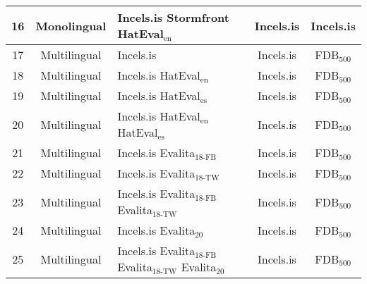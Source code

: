 \begin{tabular}{|c|c|p{4cm}|c|c|}
16 & Monolingual & Incels.is \newline Stormfront \newline HatEval$_{\mbox{en}}$ & Incels.is & Incels.is \\ \hline
17 & Multilingual & Incels.is & Incels.is & FDB$_{\mbox{500}}$ \\ \hline
18 & Multilingual & Incels.is \newline HatEval$_{\mbox{en}}$ & Incels.is & FDB$_{\mbox{500}}$ \\ \hline
19 & Multilingual & Incels.is \newline HatEval$_{\mbox{es}}$ & Incels.is & FDB$_{\mbox{500}}$ \\ \hline
20 & Multilingual & Incels.is \newline HatEval$_{\mbox{en}}$ \newline HatEval$_{\mbox{es}}$ & Incels.is & FDB$_{\mbox{500}}$ \\ \hline
21 & Multilingual & Incels.is \newline Evalita$_{\mbox{18-FB}}$ & Incels.is & FDB$_{\mbox{500}}$ \\ \hline
22 & Multilingual & Incels.is \newline Evalita$_{\mbox{18-TW}}$ & Incels.is & FDB$_{\mbox{500}}$ \\ \hline
23 & Multilingual & Incels.is \newline Evalita$_{\mbox{18-FB}}$ \newline Evalita$_{\mbox{18-TW}}$ & Incels.is & FDB$_{\mbox{500}}$ \\ \hline
24 & Multilingual & Incels.is \newline Evalita$_{\mbox{20}}$ & Incels.is & FDB$_{\mbox{500}}$ \\ \hline
25 & Multilingual & Incels.is \newline Evalita$_{\mbox{18-FB}}$ \newline Evalita$_{\mbox{18-TW}}$ \newline Evalita$_{\mbox{20}}$ & Incels.is & FDB$_{\mbox{500}}$ \\ \hline
\end{tabular}